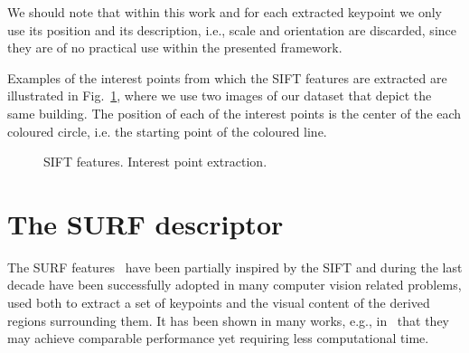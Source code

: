 We should note
that within this work and for each extracted keypoint we only use its position and its description, i.e., scale and orientation are discarded, since they are of no practical use within the presented framework.

Examples of the interest points from which the SIFT features are extracted are illustrated in Fig.~\ref{fig:sift_features}, where we use two images of our dataset that depict the same building. The position of each of the interest points is the center of the each coloured circle, i.e. the starting point of the coloured line.


\begin{figure}
    \centering
    \qquad
    
    \caption{SIFT features. Interest point extraction.}
    \label{fig:sift_features}
\end{figure}



\section{The SURF descriptor}
The SURF features~\cite{bay2006surf} have been partially inspired by the SIFT and during the last decade have been successfully adopted in many computer vision related problems, used both to extract a set of keypoints and the visual content of the derived regions surrounding them. It has been shown in many works, e.g., in~\cite{spyrou2015comparative} that they may achieve comparable performance yet requiring less computational time. 

